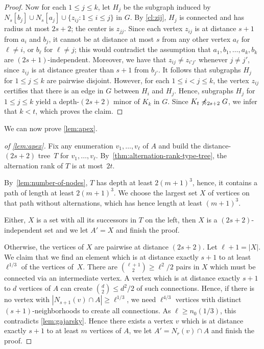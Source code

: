 \begin{proof}
Now for each $1\leq j\leq k$, let $H_j$ be the subgraph induced by $N_s[b_j]\cup N_s[a_j]\cup\{z_{ij} \colon 1\leq i\leq j\}$ in $G$.
By \cref{cl:zij}, $H_j$ is connected and has radius at most $2s+2$; the center is $z_{jj}$.
Since each vertex $z_{ij}$ is at distance $s+1$ from $a_i$ and $b_j$, it cannot be at distance at most $s$ from any other vertex $a_\ell$ for $\ell\neq i$, or $b_\ell$ for $\ell\neq j$;
this would contradict the assumption that $a_1,b_1,\ldots,a_k,b_k$ are $(2s+1)$-independent.
Moreover, we have that $z_{ij}\neq z_{i'j'}$ whenever $j\neq j'$, since $z_{ij}$ is at distance greater than $s+1$ from $b_{j'}$.
It follows that subgraphs $H_j$ for $1\leq j\leq k$ are pairwise disjoint.
However, for each $1\leq i<j\leq k$, the vertex $z_{ij}$ certifies that there is an edge in $G$ between $H_i$ and $H_j$.
Hence, subgraphs $H_j$ for $1\leq j\leq k$ yield a depth-$(2s+2)$ minor of $K_k$ in $G$.
Since $K_t\not\preccurlyeq_{2s+2} G$, we infer that $k<t$, which proves the claim.
\end{proof}

%


We can now prove \cref{lem:apex}. 

\begin{proof}[of \cref{lem:apex}]
Fix any enumeration $v_1,\ldots, v_\ell$ of $A$ and
build the distance-$(2s+2)$ tree~$T$ for
$v_1,\ldots,v_\ell$. By~\cref{thm:alternation-rank-type-tree}, 
the alternation rank of $T$ is at most~$2t$. 

By~\cref{lem:number-of-nodes}, $T$ has depth at least $2(m+1)^3$, hence, 
it contains a path of length at least $2(m+1)^3$. We choose the largest set $X$
of vertices on that path without alternations, which has hence length
at least $(m+1)^3$. 

Either, $X$ is a set with all its successors in $T$ on the left, 
then $X$ is a $(2s+2)$-independent set and we let $A'=X$ and finish the proof.

Otherwise, the vertices of $X$ are pairwise at distance $(2s+2)$. Let $\ell+1=|X|$. 
We claim that we find an element which is at distance exactly $s+1$ 
to at least $\ell^{1/3}$
of the vertices of~$X$. There are $\binom{\ell+1}{2}\geq \ell^2/2$ pairs in $X$ which 
must be connected via an intermediate vertex. A vertex which is at distance
exactly $s+1$ to $d$ vertices of $A$ can create $\binom{d}{2}\leq d^2/2$ of such connections. 
Hence, if there is no vertex with $|N_{s+1}(v)\cap A|\geq \ell^{1/3}$, 
we need $\ell^{4/3}$ vertices with distinct $(s+1)$-neighborhoods
to create all connections. As $\ell\geq n_0(1/3)$, 
this contradicts \cref{lem:gajarsky}. Hence there exists a vertex $v$ which is 
at distance exactly $s+1$ to at least $m$ vertices of $A$, 
we let $A'=N_r(v)\cap A$ and finish the proof. 
\end{proof}

